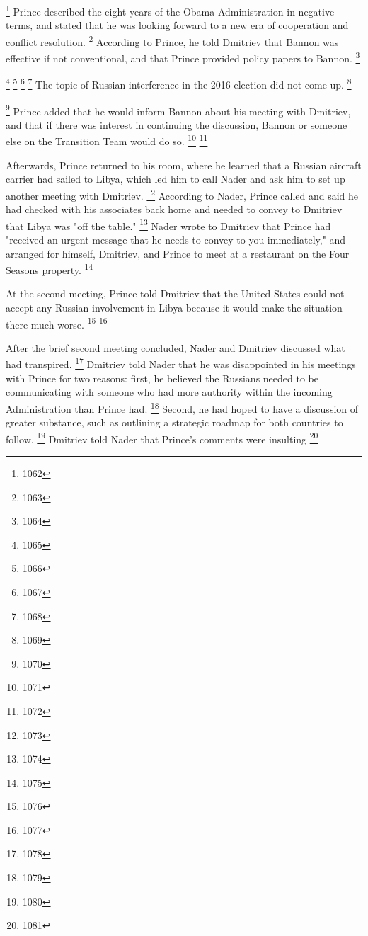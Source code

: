 \footnote{1062}
Prince described the eight years of the Obama Administration in negative terms, and stated that he was looking forward to a new era of cooperation and conflict resolution.%
\footnote{1063}
According to Prince, he told Dmitriev that Bannon was effective if not conventional, and that Prince provided policy papers to Bannon.%
\footnote{1064}

\footnote{1065}
\footnote{1066}
\footnote{1067}
\footnote{1068}
The topic of Russian interference in the 2016 election did not come up.%
\footnote{1069}

\footnote{1070}
Prince added that he would inform Bannon about his meeting with Dmitriev, and that if there was interest in continuing the discussion, Bannon or someone else on the Transition Team would do so.%
\footnote{1071}
\footnote{1072}

Afterwards, Prince returned to his room, where he learned that a Russian aircraft carrier had sailed to Libya, which led him to call Nader and ask him to set up another meeting with Dmitriev.%
\footnote{1073}
According to Nader, Prince called and said he had checked with his associates back home and needed to convey to Dmitriev that Libya was "off the table."%
\footnote{1074}
Nader wrote to Dmitriev that Prince had "received an urgent message that he needs to convey to you immediately," and arranged for himself, Dmitriev, and Prince to meet at a restaurant on the Four Seasons property.%
\footnote{1075}

At the second meeting, Prince told Dmitriev that the United States could not accept any Russian involvement in Libya because it would make the situation there much worse.%
\footnote{1076}
\footnote{1077}

After the brief second meeting concluded, Nader and Dmitriev discussed what had transpired.%
\footnote{1078}
Dmitriev told Nader that he was disappointed in his meetings with Prince for two reasons: first, he believed the Russians needed to be communicating with someone who had more authority within the incoming Administration than Prince had.%
\footnote{1079}
Second, he had hoped to have a discussion of greater substance, such as outlining a strategic roadmap for both countries to follow.%
\footnote{1080}
Dmitriev told Nader that
Prince's comments
were insulting
\footnote{1081}

